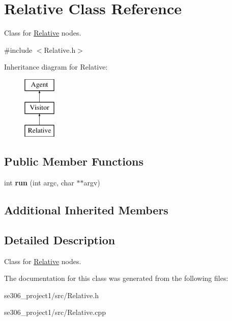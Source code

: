 \hypertarget{classRelative}{\section{Relative Class Reference}
\label{classRelative}
}


Class for \hyperlink{classRelative}{Relative} nodes.  




{\ttfamily \#include $<$Relative.\-h$>$}

Inheritance diagram for Relative\-:\begin{figure}[H]
\begin{center}
\leavevmode
\includegraphics[height=3.000000cm]{classRelative}
\end{center}
\end{figure}
\subsection*{Public Member Functions}
\begin{DoxyCompactItemize}
\item 
\hypertarget{classRelative_a966fc1a728e7b4ab9bde0cb636b5d7a9}{int {\bfseries run} (int argc, char $\ast$$\ast$argv)}\label{classRelative_a966fc1a728e7b4ab9bde0cb636b5d7a9}

\end{DoxyCompactItemize}
\subsection*{Additional Inherited Members}


\subsection{Detailed Description}
Class for \hyperlink{classRelative}{Relative} nodes. 

The documentation for this class was generated from the following files\-:\begin{DoxyCompactItemize}
\item 
se306\-\_\-project1/src/Relative.\-h\item 
se306\-\_\-project1/src/Relative.\-cpp\end{DoxyCompactItemize}
